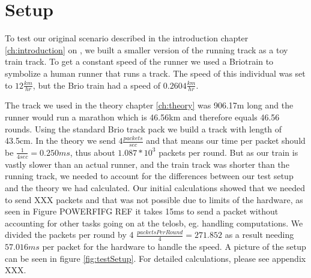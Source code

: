 \section{Setup}\label{sc:setup}

To test our original scenario described in the introduction chapter \ref{ch:introduction} on \pageref{ch:introduction}, we built a smaller version of the running track as a toy train track. To get a constant speed of the runner we used a Brio\texttrademark train to symbolize a human runner that runs a track. The speed of this individual was set to $12\frac{km}{hr}$, but the Brio train had a speed of $0.2604\frac{km}{hr}$.

\noindent The track we used in the theory chapter \ref{ch:theory} was 906.17m long and the runner would run a marathon which is 46.56km and therefore equals 46.56 rounds. Using the standard Brio track pack we build a track with length of 43.5cm. In the theory we send $4\frac{packets}{sec}$ and that means our time per packet should be $\frac{1}{4sec} = 0.250ms$, thus about $1.087*10^3$ packets per round. But as our train is vastly slower than an actual runner, and the train track was shorter than the running track, we needed to account for the differences between our test setup and the theory we had calculated. Our initial calculations showed that we needed to send XXX packets and that was not possible due to limits of the hardware, as seen in Figure POWERFIFG REF it takes 15ms to send a packet without accounting for other tasks going on at the telosb, eg. handling computations. We divided the packets per round by 4 $ \frac{packetsPerRound}{4} = 271.852 $ as a result needing $57.016 ms$ per packet for the hardware to handle the speed. A picture of the setup can be seen in figure \ref{fig:testSetup}. For detailed calculations, please see appendix XXX.
